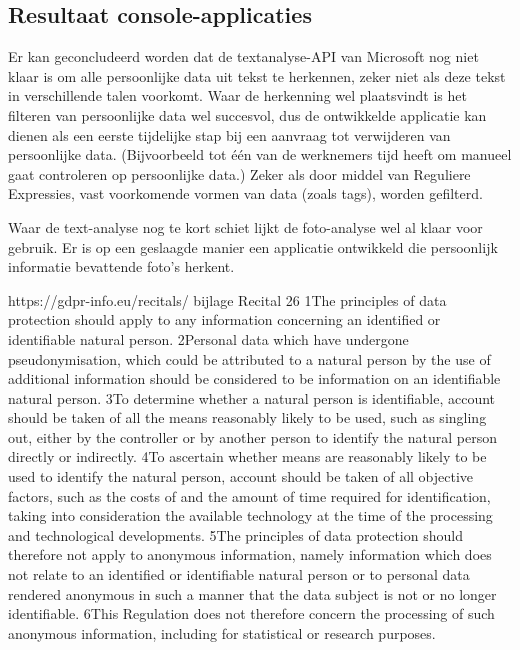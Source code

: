 \subsection{Resultaat console-applicaties}
Er kan geconcludeerd worden dat de textanalyse-API van Microsoft nog niet klaar is om alle persoonlijke data uit tekst te herkennen, zeker niet als deze tekst in verschillende talen voorkomt.
Waar de herkenning wel plaatsvindt is het filteren van persoonlijke data wel succesvol, dus de ontwikkelde applicatie kan dienen als een eerste tijdelijke stap bij een aanvraag tot verwijderen van persoonlijke data. (Bijvoorbeeld tot één van de werknemers tijd heeft om manueel gaat controleren op persoonlijke data.) 
Zeker als door middel van Reguliere Expressies, vast voorkomende vormen van data (zoals tags), worden gefilterd. 

Waar de text-analyse nog te kort schiet lijkt de foto-analyse wel al klaar voor gebruik. Er is op een geslaagde manier een applicatie ontwikkeld die persoonlijk informatie bevattende foto's herkent. 



https://gdpr-info.eu/recitals/ bijlage
Recital 26
1The principles of data protection should apply to any information concerning an identified or identifiable natural person. 2Personal data which have undergone pseudonymisation, which could be attributed to a natural person by the use of additional information should be considered to be information on an identifiable natural person. 3To determine whether a natural person is identifiable, account should be taken of all the means reasonably likely to be used, such as singling out, either by the controller or by another person to identify the natural person directly or indirectly. 4To ascertain whether means are reasonably likely to be used to identify the natural person, account should be taken of all objective factors, such as the costs of and the amount of time required for identification, taking into consideration the available technology at the time of the processing and technological developments. 5The principles of data protection should therefore not apply to anonymous information, namely information which does not relate to an identified or identifiable natural person or to personal data rendered anonymous in such a manner that the data subject is not or no longer identifiable. 6This Regulation does not therefore concern the processing of such anonymous information, including for statistical or research purposes.

